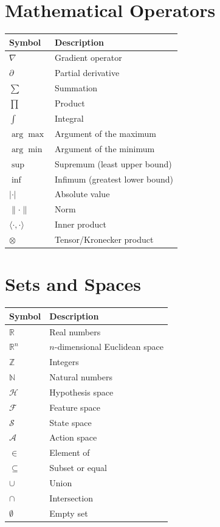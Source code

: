 \section*{Mathematical Operators}

\begin{tabular}{ll}
\toprule
\textbf{Symbol}  & \textbf{Description} \\
\midrule
$\nabla$ & Gradient operator \\
$\partial$ & Partial derivative \\
$\sum$ & Summation \\
$\prod$ & Product \\
$\int$ & Integral \\
$\arg\max$ & Argument of the maximum \\
$\arg\min$ & Argument of the minimum \\
$\sup$ & Supremum (least upper bound) \\
$\inf$ & Infimum (greatest lower bound) \\
$|\cdot|$ & Absolute value \\
$\|\cdot\|$ & Norm \\
$\langle \cdot, \cdot \rangle$ & Inner product \\
$\otimes$ & Tensor/Kronecker product \\
\bottomrule
\end{tabular}

\section*{Sets and Spaces}

\begin{tabular}{ll}
\toprule
\textbf{Symbol}  & \textbf{Description} \\
\midrule
$\mathbb{R}$ & Real numbers \\
$\mathbb{R}^n$ & $n$-dimensional Euclidean space \\
$\mathbb{Z}$ & Integers \\
$\mathbb{N}$ & Natural numbers \\
$\mathcal{H}$ & Hypothesis space \\
$\mathcal{F}$ & Feature space \\
$\mathcal{S}$ & State space \\
$\mathcal{A}$ & Action space \\
$\in$ & Element of \\
$\subseteq$ & Subset or equal \\
$\cup$ & Union \\
$\cap$ & Intersection \\
$\emptyset$ & Empty set \\
\bottomrule
\end{tabular}

